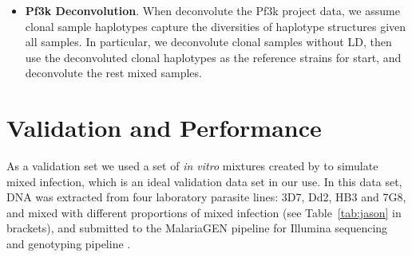 \documentclass{bioinfo}
\begin{document}
\begin{itemize}
\item {\bf Pf3k Deconvolution}. When deconvolute the Pf3k\citep{Pf3k2016} project data, we assume clonal sample haplotypes capture the diversities of haplotype structures given all samples. In particular, we deconvolute clonal samples without LD, then use the deconvoluted clonal haplotypes as the reference strains for start, and deconvolute the rest mixed samples.

\end{itemize}



\section{Validation and Performance}
As a validation set we used a set of {\it in vitro} mixtures created by \citet{Wendler2015} to simulate mixed infection, which is an ideal validation data set in our use. In this data set, DNA was extracted from four laboratory parasite lines: 3D7, Dd2, HB3 and 7G8, and mixed with different proportions of mixed infection (see Table~\ref{tab:jason} in brackets), and submitted to the MalariaGEN pipeline \citep{MalariaGen2008} for Illumina sequencing and genotyping pipeline \citep{Menske2012}.
\end{document}
